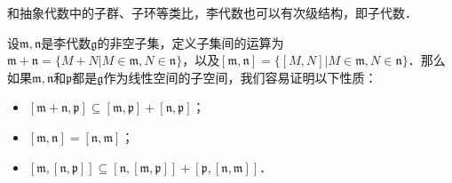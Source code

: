 



和抽象代数中的子群、子环等类比，李代数也可以有次级结构，即子代数．

设$\mathfrak{m}, \mathfrak{n}$是李代数$\mathfrak{g}$的非空子集，定义子集间的运算为$\mathfrak{m}+\mathfrak{n}=\{M+N|M\in\mathfrak{m}, N\in\mathfrak{n}\}$，以及$[\mathfrak{m}, \mathfrak{n}]=\{[M, N]|M\in\mathfrak{m}, N\in\mathfrak{n}\}$．那么如果$\mathfrak{m}, \mathfrak{n}$和$\mathfrak{p}$都是$\mathfrak{g}$作为线性空间的子空间，我们容易证明以下性质：

\begin{itemize}
\item $[\mathfrak{m}+\mathfrak{n}, \mathfrak{p}]\subseteq[\mathfrak{m}, \mathfrak{p}]+[\mathfrak{n}, \mathfrak{p}]$；
\item $[\mathfrak{m},\mathfrak{n}]=[\mathfrak{n}, \mathfrak{m}]$；
\item $[\mathfrak{m}, [\mathfrak{n}, \mathfrak{p}]]\subseteq[\mathfrak{n}, [\mathfrak{m}, \mathfrak{p}]]+[\mathfrak{p}, [\mathfrak{n}, \mathfrak{m}]]$．
\end{itemize}



